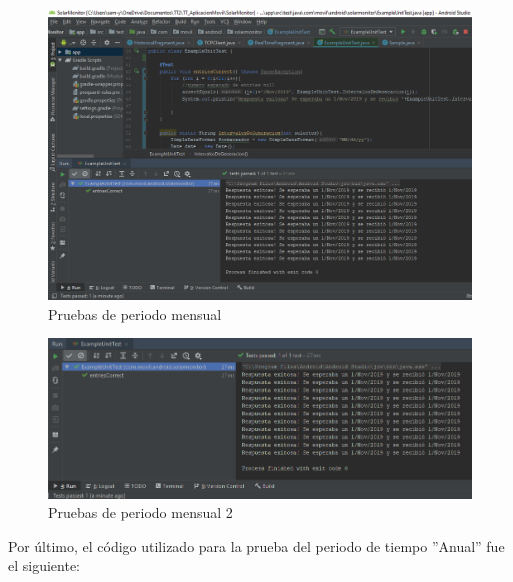 \begin{figure}[H]
	\centering
	\includegraphics[scale=.4]{Capitulo5/images/PruebasMensualPeriodo.png}
	\caption{Pruebas de periodo mensual}
	\label{fig:Pruebas_de_periodo_mensual}
\end{figure}

\begin{figure}[H]
	\centering
	\includegraphics[scale=.4]{Capitulo5/images/PruebasMensualPeriodo2.png}
	\caption{Pruebas de periodo mensual 2}
	\label{fig:Pruebas_de_periodo_mensual2}
\end{figure}

Por último, el código utilizado para la prueba del periodo de tiempo ''Anual'' fue el siguiente:\\ \newline


